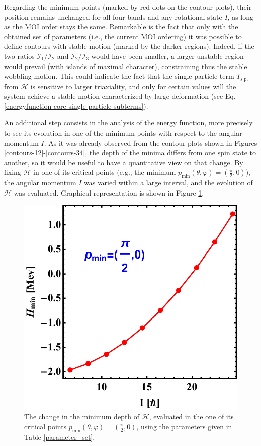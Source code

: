 \documentclass[myclassdoc,debug]{rjparticle}
\begin{document}
Regarding the minimum points (marked by red dots on the contour plots), their position remains unchanged for all four bands and any rotational state $I$, as long as the MOI order stays the same. Remarkable is the fact that only with the obtained set of parameters (i.e., the current MOI ordering) it was possible to define contours with stable motion (marked by the darker regions). Indeed, if the two ratios $\mathcal{I}_1/\mathcal{I}_2$ and $\mathcal{I}_2/\mathcal{I}_3$ would have been smaller, a larger unstable region would prevail (with islands of maximal character), constraining thus the stable wobbling motion. This could indicate the fact that the single-particle term $T_\text{s.p.}$ from $\mathcal{H}$ is sensitive to larger triaxiality, and only for certain values will the system achieve a stable motion characterized by large deformation (see Eq. \ref{energyfunction-core-single-particle-subterms}).

An additional step consists in the analysis of the energy function, more precisely to see its evolution in one of the minimum points with respect to the angular momentum $I$. As it was already observed from the contour plots shown in Figures \ref{contours-12}-\ref{contours-34}, the depth of the minima differs from one spin state to another, so it would be useful to have a quantitative view on that change. By fixing $\mathcal{H}$ in one of its critical points (e.g., the minimum $p_\text{min}(\theta,\varphi)=(\frac{\pi}{2},0)$), the angular momentum $I$ was varied within a large interval, and the evolution of $\mathcal{H}$ was evaluated. Graphical representation is shown in Figure \ref{energy-function-minimum-evolution}.

\begin{figure}
    \centering
    \includegraphics[scale=0.50]{figs/energy_function_minPoint_Evolution.pdf}
    \caption{The change in the minimum depth of $\mathcal{H}$, evaluated in the one of its critical points $p_\text{min}(\theta,\varphi)=(\frac{\pi}{2},0)$, using the parameters given in Table \ref{parameter_set}.}
    \label{energy-function-minimum-evolution}
\end{figure}
\end{document}
